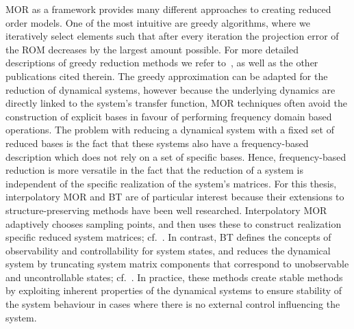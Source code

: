 \ac{MOR} as a framework provides many different approaches to creating reduced order models.
One of the most intuitive are greedy algorithms, where we iteratively select elements such that after every iteration the projection error of the \ac{ROM} decreases by the largest amount possible.
For more detailed descriptions of greedy reduction methods we refer to~\cite{Grepl2005, Rozza2008, Buffa2012}, as well as the other publications cited therein.
The greedy approximation can be adapted for the reduction of dynamical systems, however because the underlying dynamics are directly linked to the system's transfer function, \ac{MOR} techniques often avoid the construction of explicit bases in favour of performing frequency domain based operations.
The problem with reducing a dynamical system with a fixed set of reduced bases is the fact that these systems also have a frequency-based description which does not rely on a set of specific bases.
Hence, frequency-based reduction is more versatile in the fact that the reduction of a system is independent of the specific realization of the system's matrices.
For this thesis, interpolatory \ac{MOR} and \ac{BT} are of particular interest because their extensions to structure-preserving methods have been well researched.
Interpolatory \ac{MOR} adaptively chooses sampling points, and then uses these to construct realization specific reduced system matrices; cf.~\cite{Antoulas2005, Gugercin2009, Beattie2017}.
In contrast, \ac{BT} defines the concepts of observability and controllability for system states, and reduces the dynamical system by truncating system matrix components that correspond to unobservable and uncontrollable states; cf.~\cite{Moore1981, Enns1984, Antoulas2005, Gugercin2007, BB2017}.
In practice, these methods create stable methods by exploiting inherent properties of the dynamical systems to ensure stability of the system behaviour in cases where there is no external control influencing the system.

